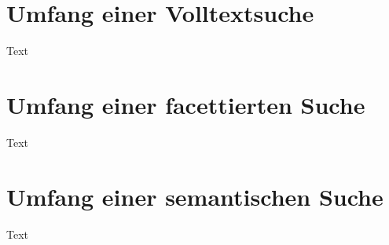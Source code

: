 



\section{Umfang einer Volltextsuche\label{sec3.2:Unterunterpunkt-2}}

Text

\section{Umfang einer facettierten Suche\label{sec3.3:Unterpunkt-3}}

Text

\section{Umfang einer semantischen Suche\label{sec3.4:Unterpunkt-4}}

Text